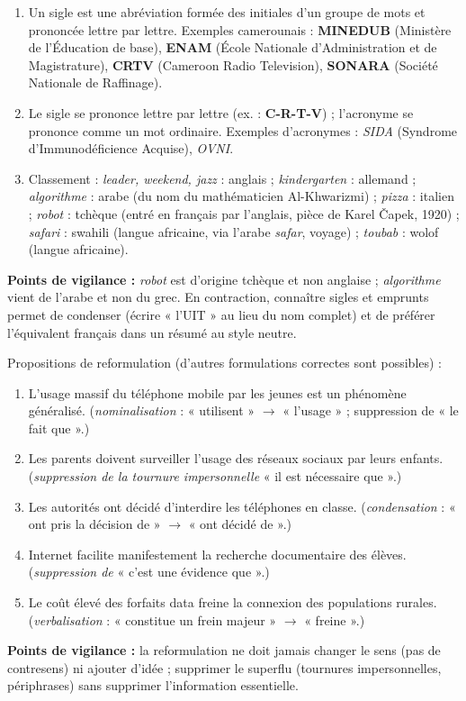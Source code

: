 \documentclass[11pt]{article}
\newcommand{\cle}[1]{{\popxbold\color{popdark}#1}}
\begin{document}
\begin{corrige}
\begin{enumerate}
\item Un \cle{sigle} est une abréviation formée des initiales d'un groupe de mots et prononcée lettre par lettre. Exemples camerounais : \textbf{MINEDUB} (Ministère de l'Éducation de base), \textbf{ENAM} (École Nationale d'Administration et de Magistrature), \textbf{CRTV} (Cameroon Radio Television), \textbf{SONARA} (Société Nationale de Raffinage).
\item Le \cle{sigle} se prononce lettre par lettre (ex. : \textbf{C-R-T-V}) ; l'\cle{acronyme} se prononce comme un mot ordinaire. Exemples d'acronymes : \emph{SIDA} (Syndrome d'Immunodéficience Acquise), \emph{OVNI}.
\item Classement : \emph{leader, weekend, jazz} : anglais ; \emph{kindergarten} : allemand ; \emph{algorithme} : arabe (du nom du mathématicien Al-Khwarizmi) ; \emph{pizza} : italien ; \emph{robot} : tchèque (entré en français par l'anglais, pièce de Karel Čapek, 1920) ; \emph{safari} : swahili (langue africaine, via l'arabe \emph{safar}, voyage) ; \emph{toubab} : wolof (langue africaine).
\end{enumerate}
\textbf{Points de vigilance :} \emph{robot} est d'origine tchèque et non anglaise ; \emph{algorithme} vient de l'arabe et non du grec. En contraction, connaître sigles et emprunts permet de condenser (écrire « l'UIT » au lieu du nom complet) et de préférer l'équivalent français dans un résumé au style neutre.
\end{corrige}

\begin{corrige}
Propositions de reformulation (d'autres formulations correctes sont possibles) :
\begin{enumerate}
\item L'usage massif du téléphone mobile par les jeunes est un phénomène généralisé. (\emph{nominalisation} : « utilisent » $\to$ « l'usage » ; suppression de « le fait que ».)
\item Les parents doivent surveiller l'usage des réseaux sociaux par leurs enfants. (\emph{suppression de la tournure impersonnelle} « il est nécessaire que ».)
\item Les autorités ont décidé d'interdire les téléphones en classe. (\emph{condensation} : « ont pris la décision de » $\to$ « ont décidé de ».)
\item Internet facilite manifestement la recherche documentaire des élèves. (\emph{suppression de} « c'est une évidence que ».)
\item Le coût élevé des forfaits data freine la connexion des populations rurales. (\emph{verbalisation} : « constitue un frein majeur » $\to$ « freine ».)
\end{enumerate}
\textbf{Points de vigilance :} la reformulation ne doit jamais changer le sens (pas de contresens) ni ajouter d'idée ; supprimer le superflu (tournures impersonnelles, périphrases) sans supprimer l'information essentielle.
\end{corrige}
\end{document}
